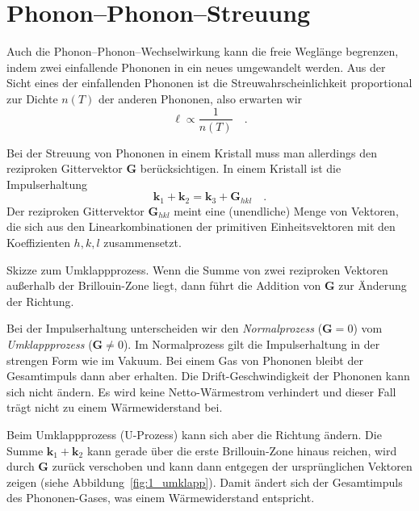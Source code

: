 
\section{Phonon--Phonon--Streuung}

Auch die Phonon--Phonon--Wechselwirkung kann die freie Weglänge begrenzen, indem zwei einfallende Phononen in ein neues umgewandelt werden. Aus der Sicht eines der einfallenden Phononen ist die Streuwahrscheinlichkeit proportional zur Dichte $n(T)$ der anderen Phononen, also erwarten wir
\begin{equation}
    \ell \propto \frac{1}{n(T)} \quad . \label{eq:1_ell_n}
\end{equation}



Bei der Streuung von Phononen in einem Kristall muss man allerdings den reziproken Gittervektor $\mathbf{G}$ berücksichtigen. In einem Kristall ist die Impulserhaltung
\begin{equation}
    \mathbf{k}_1 +  \mathbf{k}_2 =  \mathbf{k}_3 +  \mathbf{G}_{hkl}  \quad .
\end{equation}
Der reziproken Gittervektor $\mathbf{G}_{hkl}$ meint eine (unendliche) Menge von Vektoren, die sich aus den Linearkombinationen der primitiven Einheitsvektoren mit den Koeffizienten $h,k,l$ zusammensetzt. 


\begin{marginfigure}
   \caption{Skizze zum Umklappprozess. Wenn die Summe von zwei reziproken Vektoren außerhalb der Brillouin-Zone liegt, dann führt die Addition von $\mathbf{G}$ zur Änderung der Richtung. }
   \label{fig:1_umklapp}
\end{marginfigure}

Bei der Impulserhaltung unterscheiden wir den \emph{Normalprozess} ($\mathbf{G} = 0$) vom \emph{Umklappprozess} ($\mathbf{G} \neq 0$). Im Normalprozess gilt die Impulserhaltung in der strengen Form wie im Vakuum. Bei einem Gas von Phononen bleibt der Gesamtimpuls dann aber erhalten.  Die Drift-Geschwindigkeit der Phononen kann sich nicht ändern. Es wird keine Netto-Wärmestrom verhindert und dieser Fall trägt nicht zu einem Wärmewiderstand bei. 

Beim Umklappprozess (U-Prozess) kann sich aber die Richtung ändern. Die Summe $ \mathbf{k}_1 +  \mathbf{k}_2 $ kann gerade über die erste Brillouin-Zone hinaus reichen, wird durch $\mathbf{G}$ zurück verschoben und kann dann entgegen der ursprünglichen Vektoren zeigen (siehe Abbildung~\ref{fig:1_umklapp}). Damit ändert sich der Gesamtimpuls des Phononen-Gases, was einem Wärmewiderstand entspricht.

